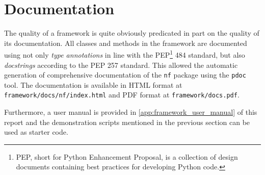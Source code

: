 \section{Documentation}
The quality of a framework is quite obviously predicated in part on the quality of its documentation.
All classes and methods in the framework are documented using not only \textit{type annotations} in line with the PEP\footnote{PEP, short for Python Enhancement Proposal, is a collection of design documents containing best practices for developing Python code.} 484 standard, but also \textit{docstrings} according to the PEP 257 standard.
This allowed the automatic generation of comprehensive documentation of the \texttt{nf} package using the \texttt{pdoc} tool. 
The documentation is available in HTML format at \texttt{framework/docs/nf/index.html} and PDF format at \texttt{framework/docs.pdf}.

Furthermore, a user manual is provided in \ref{app:framework_user_manual} of this report and the demonstration scripts mentioned in the previous section can be used as starter code.

